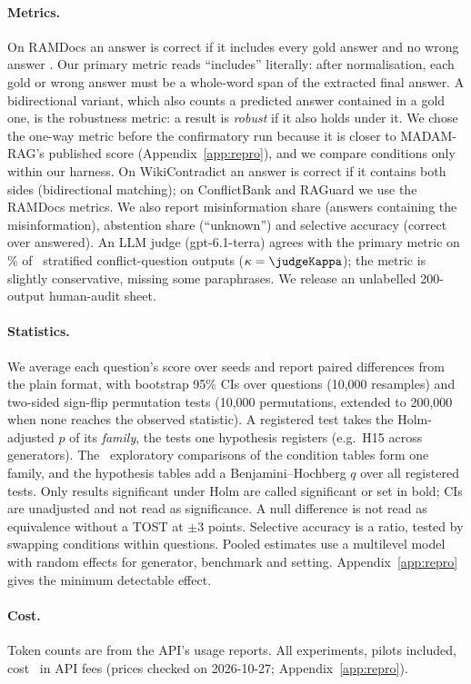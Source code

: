 \paragraph{Metrics.}
On RAMDocs an answer is correct if it includes every gold answer and no wrong answer \citep{wang2025madam}. Our primary
metric reads ``includes'' literally: after normalisation, each gold or wrong answer must be a whole-word span
of the extracted final answer. A bidirectional variant, which also counts a predicted answer contained in a gold one,
is the robustness metric: a result is \emph{robust} if it also holds under it. We chose the one-way metric before the confirmatory run because it is closer to MADAM-RAG's
published score (Appendix~\ref{app:repro}), and we compare conditions only within our harness. On WikiContradict
an answer is correct if it contains both sides (bidirectional matching); on ConflictBank and RAGuard we use the RAMDocs metrics. We also report
misinformation share (answers containing the misinformation), abstention share (``unknown'') and selective accuracy
(correct over answered). An LLM judge (gpt-6.1-terra) agrees with the primary metric on \judgeAgree\% of \judgeN\ stratified
conflict-question outputs ($\kappa=\judgeKappa$); the metric is slightly conservative, missing some paraphrases. We
release an unlabelled 200-output human-audit sheet.

\paragraph{Statistics.}
We average each question's score over seeds and report paired differences from the plain format, with
bootstrap 95\% CIs over questions (10,000 resamples) and two-sided sign-flip permutation tests
\citep{efron1993bootstrap,dror2018hitchhiker} (10,000 permutations, extended to 200,000 when none reaches the observed
statistic). A registered test takes the Holm-adjusted $p$ \citep{holm1979simple} of its \emph{family}, the tests one
hypothesis registers (e.g.\ H15 across generators). The \nExploratory\ exploratory comparisons of the
condition tables form one family, and the hypothesis tables add a Benjamini--Hochberg $q$ over all registered tests.
Only results significant under Holm are called significant or set in bold; CIs are unadjusted and not read as
significance. A null difference is not read
as equivalence without a TOST \citep{lakens2017equivalence} at $\pm$3 points. Selective accuracy is a ratio, tested by swapping conditions within questions. Pooled estimates use a multilevel model with random
effects for generator, benchmark and setting. Appendix~\ref{app:repro} gives the minimum detectable effect.

\paragraph{Cost.}
Token counts are from the API's usage reports. All experiments, pilots included, cost \totalSpend\ in API fees
(prices checked on 2026-10-27; Appendix~\ref{app:repro}).
